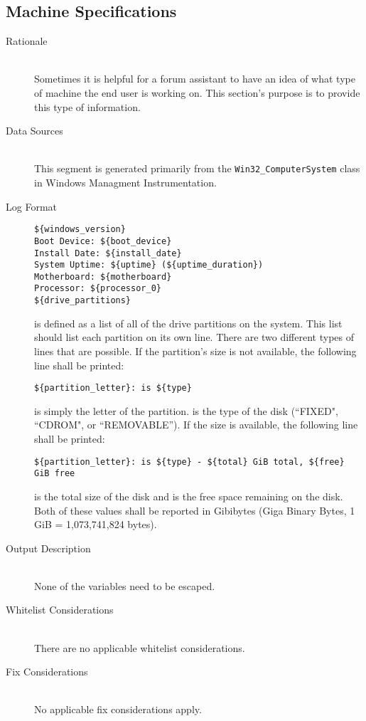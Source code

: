\subsection{Machine Specifications}
\begin{description}
\item[Rationale] \hfill \\
Sometimes it is helpful for a forum assistant to have an idea of what type of
machine the end user is working on.  This section's purpose is to provide this
type of information.
\item[Data Sources] \hfill \\
This segment is generated primarily from the \verb|Win32_ComputerSystem| class
in Windows Managment Instrumentation.
\item[Log Format] \hfill 
\vspace{-\baselineskip}
\begin{verbatim}
${windows_version}
Boot Device: ${boot_device}
Install Date: ${install_date}
System Uptime: ${uptime} (${uptime_duration})
Motherboard: ${motherboard}
Processor: ${processor_0}
${drive_partitions}
\end{verbatim}
 is defined as a list of all of the drive partitions
on the system.  This list should list each partition on its own line.  There are
two different types of lines that are possible.  If the partition's size is not
available, the following line shall be printed:
\vspace{-\baselineskip}
\begin{verbatim}
${partition_letter}: is ${type}
\end{verbatim}
 is simply the letter of the partition.   is
the type of the disk (``FIXED", ``CDROM", or ``REMOVABLE'').  If the size is
available, the following line shall be printed:
\vspace{-\baselineskip}
\begin{verbatim}
${partition_letter}: is ${type} - ${total} GiB total, ${free} GiB free
\end{verbatim}
 is the total size of the disk and  is the free space
remaining on the disk.  Both of these values shall be reported in Gibibytes
(Giga Binary Bytes, 1 GiB = 1,073,741,824 bytes).

\item[Output Description] \hfill \\
None of the variables need to be escaped.
\item[Whitelist Considerations] \hfill \\
There are no applicable whitelist considerations.
\item[Fix Considerations] \hfill \\
No applicable fix considerations apply.  
\end{description}

